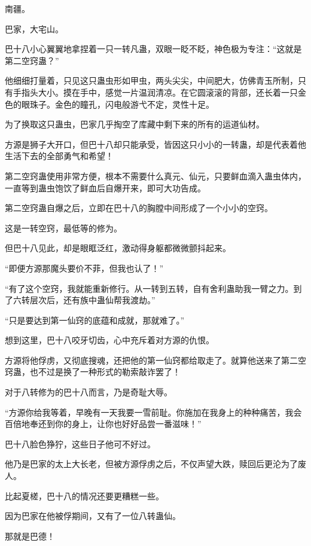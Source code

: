 
\begin{this_body}

南疆。

巴家，大宅山。

巴十八小心翼翼地拿捏着一只一转凡蛊，双眼一眨不眨，神色极为专注：“这就是第二空窍蛊？”

他细细打量着，只见这只蛊虫形如甲虫，两头尖尖，中间肥大，仿佛青玉所制，只有手指头大小。摸在手中，感觉一片温润清凉。在它圆滚滚的背部，还长着一只金色的眼珠子。金色的瞳孔，闪电般游弋不定，灵性十足。

为了换取这只蛊虫，巴家几乎掏空了库藏中剩下来的所有的运道仙材。

方源是狮子大开口，但巴十八却只能承受，皆因这只小小的一转蛊，却是代表着他生活下去的全部勇气和希望！

第二空窍蛊使用非常方便，根本不需要什么真元、仙元，只要鲜血滴入蛊虫体内，一直等到蛊虫饱饮了鲜血后自爆开来，即可大功告成。

第二空窍蛊自爆之后，立即在巴十八的胸膛中间形成了一个小小的空窍。

这是一转空窍，最低等的修为。

但巴十八见此，却是眼眶泛红，激动得身躯都微微颤抖起来。

“即便方源那魔头要价不菲，但我也认了！”

“有了这个空窍，我就能重新修行。从一转到五转，自有舍利蛊助我一臂之力。到了六转层次后，还有族中蛊仙帮我渡劫。”

“只是要达到第一仙窍的底蕴和成就，那就难了。”

想到这里，巴十八咬牙切齿，心中充斥着对方源的仇恨。

方源将他俘虏，又彻底搜魂，还把他的第一仙窍都给取走了。就算他送来了第二空窍蛊，也不过是换了一种形式的勒索敲诈罢了！

对于八转修为的巴十八而言，乃是奇耻大辱。

“方源你给我等着，早晚有一天我要一雪前耻。你施加在我身上的种种痛苦，我会百倍地奉还到你的身上，让你也好好品尝一番滋味！”

巴十八脸色狰狞，这些日子他可不好过。

他乃是巴家的太上大长老，但被方源俘虏之后，不仅声望大跌，赎回后更沦为了废人。

比起夏槎，巴十八的情况还要更糟糕一些。

因为巴家在他被俘期间，又有了一位八转蛊仙。

那就是巴德！


\end{this_body}
